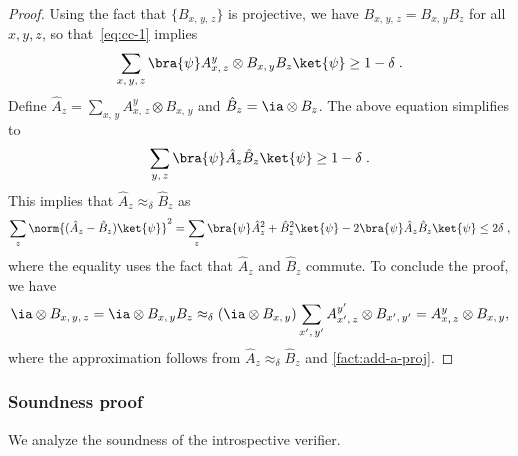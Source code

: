 \begin{proof}
  Using the fact that $\{B_{x,\, y,\, z}\}$ is projective, we have $B_{x,\, y,\, z} =
  B_{x,\, y} B_z$ for all $x,y,z$, so that~\eqref{eq:cc-1} implies
  \begin{equation*}
    \sum_{x,\, y,\, z} \bra{\psi} A^y_{x,\, z} \otimes B_{x,\, y} B_{z}
    \ket{\psi} \ge 1 - \delta\;.
  \end{equation*}
  Define $\hat{A}_z = \sum_{x,\, y} A^y_{x,\, z} \otimes B_{x,\, y}$ and
  $\hat{B}_z = \ia \otimes B_z$.
  The above equation simplifies to
  \begin{equation*}
    \sum_{y,\, z} \bra{\psi} \hat{A}_z \hat{B}_z \ket{\psi} \ge 1 - \delta\;.
  \end{equation*}
  This implies that $\hat{A}_z \approx_\delta \hat{B}_z$ as
  \begin{equation*}
    \sum_z \norm{(\hat{A}_z - \hat{B}_z) \ket{\psi}}^2 = \sum_z \bra{\psi}
    \hat{A}_z^2 + \hat{B}_z^2 \ket{\psi} - 2 \bra{\psi} \hat{A}_z \hat{B}_z
    \ket{\psi} \le 2 \delta\;,
  \end{equation*}
  where the equality uses the fact that $\hat{A}_z$ and $\hat{B}_z$ commute.
  To conclude the proof, we have
  \begin{equation*}
    \ia \otimes B_{x,\, y,\, z} = \ia \otimes B_{x,\, y} B_z \approx_\delta (\ia
    \otimes B_{x,\, y}) \sum_{x',\, y'} A^{y'}_{x',\, z} \otimes B_{x',\, y'} =
    A^y_{x,\, z} \otimes B_{x,\, y},
  \end{equation*}
  where the approximation follows from $\hat{A}_z \approx_\delta \hat{B}_z$ and
  \cref{fact:add-a-proj}.

\end{proof}

\subsubsection{Soundness proof}

We analyze the soundness of the introspective verifier.

